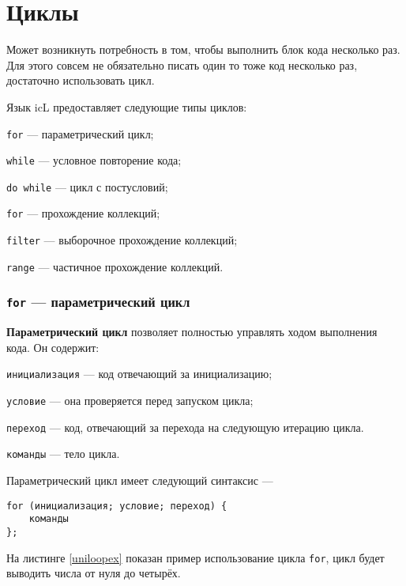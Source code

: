 \section{Циклы}

Может возникнуть потребность в том, чтобы выполнить блок кода несколько раз. Для этого совсем не обязательно писать один то тоже код несколько раз, достаточно использовать цикл.

Язык icL предоставляет следующие типы циклов:

\begin{icItems}
\item
	\texttt{for} — параметрический цикл;
\item
	\texttt{while} — условное повторение кода;
\item
	\texttt{do while} — цикл с постусловий;
\item
	\texttt{for} — прохождение коллекций;
\item
	\texttt{filter} — выборочное прохождение коллекций;
\item
	\texttt{range} — частичное прохождение коллекций.
\end{icItems}


\subsubsection{\texttt{for} — параметрический цикл}

{\bf Параметрический цикл} позволяет полностью управлять ходом выполнения кода. Он содержит:

\begin{icItems}
\item
	\texttt{инициализация} — код отвечающий за инициализацию;
\item
	\texttt{условие} — она проверяется перед запуском цикла;
\item
	\texttt{переход} — код, отвечающий за перехода на следующую итерацию цикла.
\item
	\texttt{команды} — тело цикла.
\end{icItems}

Параметрический цикл имеет следующий синтаксис —
\begin{verbatim}
for (инициализация; условие; переход) {
	команды
};
\end{verbatim}

На листинге \ref{uniloopex} показан пример использование цикла \texttt{for}, цикл будет выводить числа от нуля до четырёх.


